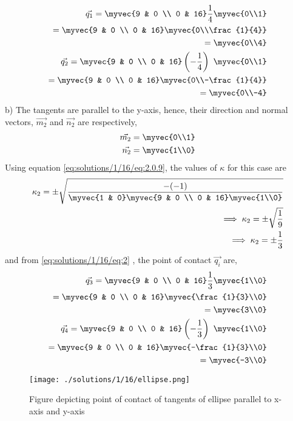 \begin{align}
    \vec{q_1}=\myvec{9 & 0 \\ 0 & 16}\frac{1}{4}\myvec{0\\1}\\
    =\myvec{9 & 0 \\ 0 & 16}\myvec{0\\\frac{1}{4}}\\
    =\myvec{0\\4}\\
    \vec{q_2}=\myvec{9 & 0 \\ 0 & 16}\left(-\frac{1}{4}\right)\ \myvec{0\\1}\\
    =\myvec{9 & 0 \\ 0 & 16}\myvec{0\\-\frac{1}{4}}\\
    =\myvec{0\\-4}
\end{align}
b) The tangents are parallel to the y-axis, hence, their direction and normal vectors, $\vec{m_2}$ and $\vec{n_2}$ are respectively,
\begin{align}
\vec{m_2}=\myvec{0\\1}\\
\vec{n_2}=\myvec{1\\0}
\end{align}
Using equation \eqref{eq:solutions/1/16/eq:2.0.9}, the values of $\kappa$ for this case are
\begin{align}
     \kappa_2=\pm \sqrt{\frac{-(-1)}{\myvec{1 & 0}\myvec{9 & 0 \\ 0 & 16} \myvec{1\\0}}}\\
 \implies \kappa_2=\pm \sqrt{\frac{1}{9}}\\
    \implies \kappa_2=\pm \frac{1}{3} 
\end{align}
and from \eqref{eq:solutions/1/16/eq:2} , the point of contact $\vec{q_i}$ are,
\begin{align}
\vec{q_3}=\myvec{9 & 0 \\ 0 & 16}\frac{1}{3}\myvec{1\\0}\\
    =\myvec{9 & 0 \\ 0 & 16}\myvec{\frac{1}{3}\\0}\\
    =\myvec{3\\0}\\
\vec{q_4}=\myvec{9 & 0 \\ 0 & 16}\left(-\frac{1}{3}\right)\ \myvec{1\\0}\\
    =\myvec{9 & 0 \\ 0 & 16}\myvec{-\frac{1}{3}\\0}\\
    =\myvec{-3\\0}
\end{align}
 \begin{figure}[h!]
	\centering
	\texttt{[image: ./solutions/1/16/ellipse.png]}
	\caption{Figure depicting point of contact of tangents of ellipse parallel to x-axis and y-axis}
	\label{eq:solutions/1/16/fig1}
\end{figure}

